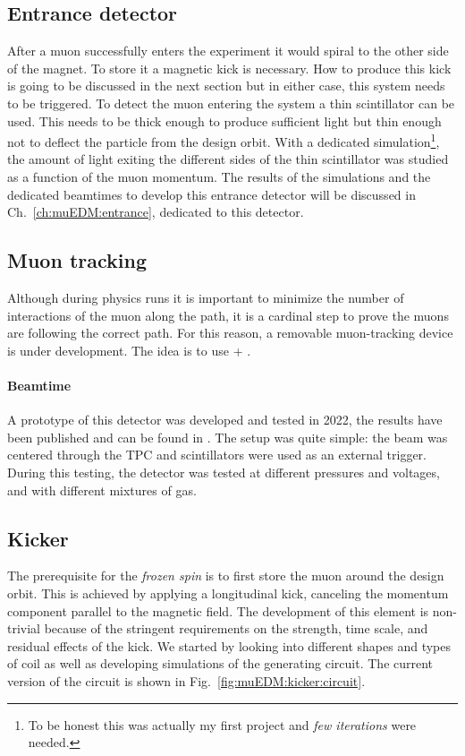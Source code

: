 \begin{refsection}
    \subsection{Entrance detector} 
        After a muon successfully enters the experiment it would spiral to the other side of the magnet. 
        To store it a magnetic kick is necessary. 
        How to produce this kick is going to be discussed in the next section but in either case, this system needs to be triggered.
        To detect the muon entering the system a thin scintillator can be used.
        This needs to be thick enough to produce sufficient light but thin enough not to deflect the particle from the design orbit.
        With a dedicated \gf simulation\footnote{To be honest this was actually my first \gf project and \textit{few iterations} were needed.}, the amount of light exiting the different sides of the thin scintillator was studied as a function of the muon momentum. 
        The results of the simulations and the dedicated beamtimes to develop this entrance detector will be discussed in Ch.~\ref{ch:muEDM:entrance}, dedicated to this detector.

    \subsection{Muon tracking}
    \label{sec:muEDM:gridpix:beamtime}
        Although during physics runs it is important to minimize the number of interactions of the muon along the path, it is a cardinal step to prove the muons are following the correct path.
        For this reason, a removable muon-tracking device is under development.
        The idea is to use \tpc + \grid.

        \paragraph{Beamtime}
        A prototype of this detector was developed and tested in 2022, the results have been published and can be found in \cite{muEDM:PSI:GridPix}.
        The setup was quite simple: the beam was centered through the TPC and scintillators were used as an external trigger.
        During this testing, the detector was tested at different pressures and voltages, and with different mixtures of gas.
    \subsection{Kicker}
        The prerequisite for the \textit{frozen spin} is to first store the muon around the design orbit.
        This is achieved by applying a longitudinal kick, canceling the momentum component parallel to the magnetic field.
        The development of this element is non-trivial because of the stringent requirements on the strength, time scale, and residual effects of the kick.
        We started by looking into different shapes and types of coil as well as developing \ltsp simulations of the generating circuit.
        The current version of the circuit is shown in Fig.~\ref{fig:muEDM:kicker:circuit}.
        

\end{refsection}
